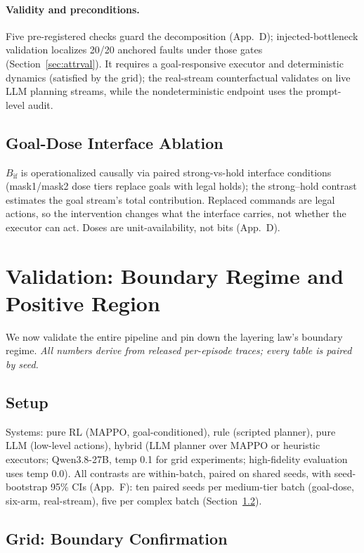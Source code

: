 \documentclass[sigconf,anonymous]{aamas}
\newcommand{\sapp}[1]{App.~#1}
\newcommand{\Bif}{B_{\mathrm{if}}}
\begin{document}
\paragraph{Validity and preconditions.}
Five pre-registered checks guard the decomposition (\sapp{D}); injected-bottleneck validation localizes 20/20 anchored faults under those gates (Section~\ref{sec:attrval}). It requires a goal-responsive executor and deterministic dynamics (satisfied by the grid); the real-stream counterfactual validates on live LLM planning streams, while the nondeterministic endpoint uses the prompt-level audit.

\subsection{Goal-Dose Interface Ablation}\label{sec:goaldose}

$\Bif$ is operationalized causally via paired strong-vs-hold interface conditions (mask1/mask2 dose tiers replace goals with legal holds); the strong--hold contrast estimates the goal stream's total contribution. Replaced commands are legal actions, so the intervention changes what the interface carries, not whether the executor can act. Doses are unit-availability, not bits (\sapp{D}).

\section{Validation: Boundary Regime and Positive Region}\label{sec:exp}

We now validate the entire pipeline and pin down the layering law's boundary regime. \emph{All numbers derive from released per-episode traces; every table is paired by seed.}

\subsection{Setup}\label{sec:setup}

Systems: pure RL (MAPPO, goal-conditioned), rule (scripted planner), pure LLM (low-level actions), hybrid (LLM planner over MAPPO or heuristic executors; Qwen3.8-27B, temp 0.1 for grid experiments; high-fidelity evaluation uses temp 0.0). All contrasts are within-batch, paired on shared seeds, with seed-bootstrap 95\% CIs (\sapp{F}): ten paired seeds per medium-tier batch (goal-dose, six-arm, real-stream), five per complex batch (Section~\ref{sec:payoff}).

\subsection{Grid: Boundary Confirmation}\label{sec:payoff}
\end{document}
